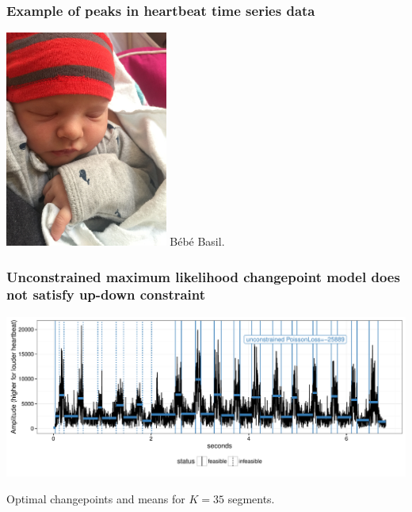 \documentclass{beamer}
\begin{document}
\begin{frame}
  \frametitle{Example of peaks in heartbeat time series data}
  \includegraphics[width=0.4\textwidth]{Basil} B\'eb\'e Basil.
\end{frame}

\begin{frame}
  \frametitle{Unconstrained maximum likelihood changepoint
model does not satisfy up-down constraint}
  \includegraphics[width=\textwidth]{figure-heartbeat-unconstrained}

Optimal changepoints and means for $K=35$ segments.
\end{frame}
 
\end{document}
